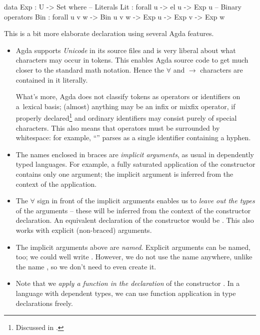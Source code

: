 \begin{code}
  data Exp : U -> Set where
    -- Literals
    Lit : forall {u} -> el u -> Exp u
    -- Binary operators
    Bin : forall {u v w} -> Bin u v w -> Exp u -> Exp v -> Exp w
\end{code}\label{sec:simple-exp}

\noindent This is a bit more elaborate declaration using several Agda features.
\begin{itemize}
	\item Agda supports \emph{Unicode} in its source files and is very liberal about what
		characters may occur in tokens. This enables Agda source code to get much closer
		to the standard math notation. Hence the $\forall$ and $\to$ characters
		are contained in it literally.
		
		What's more, Agda does not classify tokens as operators or identifiers
		on a~lexical basis; (almost) anything may be an infix or mixfix operator,
		if properly declared\footnote{Discussed in .} and ordinary
		identifiers may consist purely of special characters.
		This also means that operators must be surrounded by whitespace: for example,
		``'' parses as a single identifier containing a hyphen.
		
	\item The names enclosed in braces are \emph{implicit arguments}, as usual
		in dependently typed languages. For example, a fully saturated application of the
		constructor  contains only one argument; the implicit argument
		 is inferred from the context of the application.
		
	\item The $\forall$ sign in front of the implicit arguments enables us to \emph{leave
		out the types} of the arguments -- these will be inferred from the context of
		the constructor declaration. An equivalent declaration of the constructor 
		would be .
		This also works with explicit (non-braced) arguments.

	\item The implicit arguments above are \emph{named}. Explicit arguments can be named, too;
		we could well write .
		However, we do not use the name  anywhere, unlike the name ,
		so we don't need to even create it.
		
	\item Note that we \emph{apply a function in the declaration} of the constructor
		. In a language with dependent types, we can use function application
		in type declarations freely.
\end{itemize}

